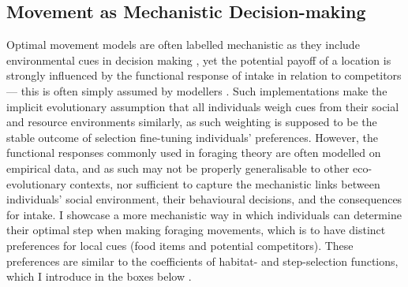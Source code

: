 \subsection*{Movement as Mechanistic Decision-making}

Optimal movement models are often labelled mechanistic as they include environmental cues in decision making \citep[e.g.][]{scherer2020}, yet the potential payoff of a location is strongly influenced by the functional response of intake in relation to competitors --- this is often simply assumed by modellers \citep[][]{vandermeer1997}.
Such implementations make the implicit evolutionary assumption that all individuals weigh cues from their social and resource environments similarly, as such weighting is supposed to be the stable outcome of selection fine-tuning individuals' preferences.
However, the functional responses commonly used in foraging theory are often modelled on empirical data, and as such may not be properly generalisable to other eco-evolutionary contexts, nor sufficient to capture the mechanistic links between individuals' social environment, their behavioural decisions, and the consequences for intake.
I showcase a more mechanistic way in which individuals can determine their optimal step when making foraging movements, which is to have distinct preferences for local cues (food items and potential competitors).
These preferences are similar to the coefficients of habitat- and step-selection functions, which I introduce in the boxes below \citep[][]{fortin2005,avgar2013,thurfjell2014,avgar2016,fieberg2010,manly2007}.

\medskip

